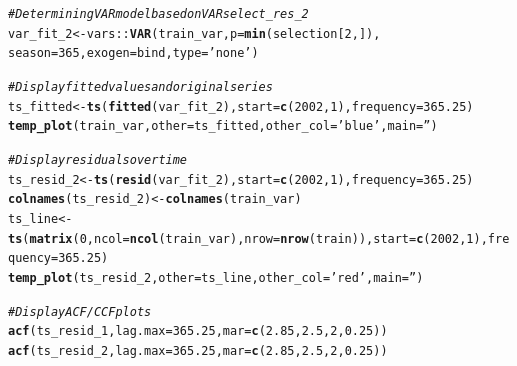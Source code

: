 \documentclass{article}\usepackage[]{graphicx}\usepackage[]{color}
\makeatletter
\newcommand{\hlnum}[1]{\textcolor[rgb]{0.686,0.059,0.569}{#1}}%
\newcommand{\hlstr}[1]{\textcolor[rgb]{0.192,0.494,0.8}{#1}}%
\newcommand{\hlcom}[1]{\textcolor[rgb]{0.678,0.584,0.686}{\textit{#1}}}%
\newcommand{\hlopt}[1]{\textcolor[rgb]{0,0,0}{#1}}%
\newcommand{\hlstd}[1]{\textcolor[rgb]{0.345,0.345,0.345}{#1}}%
\newcommand{\hlkwb}[1]{\textcolor[rgb]{0.69,0.353,0.396}{#1}}%
\newcommand{\hlkwc}[1]{\textcolor[rgb]{0.333,0.667,0.333}{#1}}%
\newcommand{\hlkwd}[1]{\textcolor[rgb]{0.737,0.353,0.396}{\textbf{#1}}}%
\newenvironment{kframe}{%
 \def\at@end@of@kframe{}%
 \ifinner\ifhmode%
  \def\at@end@of@kframe{\end{minipage}}%
  \begin{minipage}{\columnwidth}%
 \fi\fi%
 \def\FrameCommand##1{\hskip\@totalleftmargin \hskip-\fboxsep
 \colorbox{shadecolor}{##1}\hskip-\fboxsep
     \hskip-\linewidth \hskip-\@totalleftmargin \hskip\columnwidth}%
 \MakeFramed {\advance\hsize-\width
   \@totalleftmargin\z@ \linewidth\hsize
   \@setminipage}}%
 {\par\unskip\endMakeFramed%
 \at@end@of@kframe}
\newenvironment{knitrout}{}{} %
\makeatother
\begin{document}
\begin{knitrout}
\color{fgcolor}\begin{kframe}
\begin{alltt}
\hlcom{# Determining VAR model based on VARselect_res_2}
\hlstd{var_fit_2} \hlkwb{<-} \hlstd{vars}\hlopt{::}\hlkwd{VAR}\hlstd{(train_var,} \hlkwc{p}\hlstd{=}\hlkwd{min}\hlstd{(selection[}\hlnum{2}\hlstd{,]),}
  \hlkwc{season}\hlstd{=}\hlnum{365}\hlstd{,} \hlkwc{exogen}\hlstd{=bind,} \hlkwc{type}\hlstd{=}\hlstr{'none'}\hlstd{)}

\hlcom{# Display fitted values and original series}
\hlstd{ts_fitted} \hlkwb{<-} \hlkwd{ts}\hlstd{(}\hlkwd{fitted}\hlstd{(var_fit_2),} \hlkwc{start}\hlstd{=}\hlkwd{c}\hlstd{(}\hlnum{2002}\hlstd{,} \hlnum{1}\hlstd{),} \hlkwc{frequency}\hlstd{=}\hlnum{365.25}\hlstd{)}
\hlkwd{temp_plot}\hlstd{(train_var,} \hlkwc{other}\hlstd{=ts_fitted,} \hlkwc{other_col}\hlstd{=}\hlstr{'blue'}\hlstd{,} \hlkwc{main}\hlstd{=}\hlstr{''}\hlstd{)}

\hlcom{# Display residuals over time}
\hlstd{ts_resid_2} \hlkwb{<-} \hlkwd{ts}\hlstd{(}\hlkwd{resid}\hlstd{(var_fit_2),} \hlkwc{start}\hlstd{=}\hlkwd{c}\hlstd{(}\hlnum{2002}\hlstd{,} \hlnum{1}\hlstd{),} \hlkwc{frequency}\hlstd{=}\hlnum{365.25}\hlstd{)}
\hlkwd{colnames}\hlstd{(ts_resid_2)} \hlkwb{<-} \hlkwd{colnames}\hlstd{(train_var)}
\hlstd{ts_line} \hlkwb{<-} \hlkwd{ts}\hlstd{(}\hlkwd{matrix}\hlstd{(}\hlnum{0}\hlstd{,} \hlkwc{ncol}\hlstd{=}\hlkwd{ncol}\hlstd{(train_var),} \hlkwc{nrow}\hlstd{=}\hlkwd{nrow}\hlstd{(train)),} \hlkwc{start}\hlstd{=}\hlkwd{c}\hlstd{(}\hlnum{2002}\hlstd{,}\hlnum{1}\hlstd{),} \hlkwc{frequency}\hlstd{=}\hlnum{365.25}\hlstd{)}
\hlkwd{temp_plot}\hlstd{(ts_resid_2,} \hlkwc{other}\hlstd{=ts_line,} \hlkwc{other_col}\hlstd{=}\hlstr{'red'}\hlstd{,} \hlkwc{main}\hlstd{=}\hlstr{''}\hlstd{)}
\end{alltt}
\end{kframe}
\end{knitrout}
\begin{knitrout}
\color{fgcolor}\begin{kframe}
\begin{alltt}
\hlcom{# Display ACF/CCF plots}
\hlkwd{acf}\hlstd{(ts_resid_1,} \hlkwc{lag.max}\hlstd{=}\hlnum{365.25}\hlstd{,} \hlkwc{mar}\hlstd{=}\hlkwd{c}\hlstd{(}\hlnum{2.85}\hlstd{,} \hlnum{2.5}\hlstd{,} \hlnum{2}\hlstd{,} \hlnum{0.25}\hlstd{))}
\hlkwd{acf}\hlstd{(ts_resid_2,} \hlkwc{lag.max}\hlstd{=}\hlnum{365.25}\hlstd{,} \hlkwc{mar}\hlstd{=}\hlkwd{c}\hlstd{(}\hlnum{2.85}\hlstd{,} \hlnum{2.5}\hlstd{,} \hlnum{2}\hlstd{,} \hlnum{0.25}\hlstd{))}
\end{alltt}
\end{kframe}
\end{knitrout}
\end{document}
